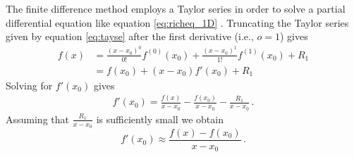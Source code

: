 The finite difference method employs a Taylor series in order to solve a partial differential equation like equation \eqref{eq:richeq_1D} \parencite{fornberg_finite_2011}.  Truncating the Taylor series given by equation \eqref{eq:tayse} after the first derivative (i.e., $o = 1$) gives
\begin{align*}
  f(x) &= \frac{(x - x_0)^0}{0!}f^{(0)}(x_0) + \frac{(x - x_0)^1}{1!}f^{(1)}(x_0) + R_1 \\
       &= f(x_0) + (x - x_0)f'(x_0) + R_1
\end{align*}
Solving for $f'(x_0)$ gives
\begin{align*}
  f'(x_0) = \frac{f(x)}{x - x_0} - \frac{f(x_0)}{x - x_0} - \frac{R_1}{x - x_0} \, .
\end{align*}
Assuming that $\frac{R_1}{x - x_0}$ is sufficiently small we obtain
\begin{equation}
  \label{eq:fidifmeth}
  f'(x_0) \approx \frac{f(x) - f(x_0)}{x - x_0} \, .
\end{equation}

